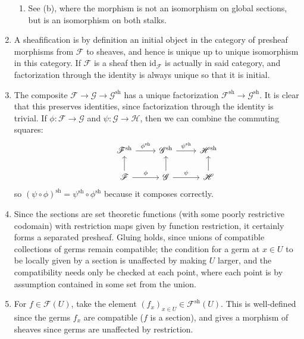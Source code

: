 \documentclass{report}
\newcommand{\sh}{{\mathrm{sh}}} %
\newcommand{\id}{{\mathrm{id}}} %
\newcommand{\scrF}{\mathscr{F}}
\newcommand{\scrG}{\mathscr{G}}
\newcommand{\scrH}{\mathscr{H}}
\begin{document}
\begin{enumerate}[label=\textbf{2.4.\Alph*.}]
\begin{enumerate}[label=(\alph*)]
		      \item See (b), where the morphism is not an isomorphism on global
		            sections, but is an isomorphism on both stalks.
	      \end{enumerate}

	\item A sheafification is by definition an initial object in the category of
	      presheaf morphisms from $\scrF$ to sheaves, and hence is unique up to
	      unique isomorphism in this category. If $\scrF$ is a sheaf then $\id_\scrF$ is
	      actually in said category, and factorization through the identity is
	      always unique so that it is initial.

	\item The composite $\scrF\to\scrG\to\scrG^\sh$ has a unique factorization
	      $\scrF^\sh\to\scrG^\sh$. It is clear that this preserves identities, since
	      factorization through the identity is trivial. If $\phi:\scrF\to\scrG$ and
	      $\psi:\scrG\to\scrH$, then we can combine the commuting squares:
	      \begin{equation*}
		      \begin{tikzcd}
			      &\scrF^\sh \arrow{r}{\phi^\sh} &\scrG^\sh \arrow{r}{\psi^\sh} &\scrH^\sh \\
			      &\scrF \arrow{r}{\phi} \arrow{u}
			      &\scrG \arrow{r}{\psi} \arrow{u}
			      &\scrH \arrow{u}
		      \end{tikzcd}
	      \end{equation*}
	      so $(\psi\circ\phi)^\sh=\psi^\sh\circ\phi^\sh$ because it composes
	      correctly.

	\item Since the sections are set theoretic functions (with some poorly
	      restrictive codomain) with restriction maps given by function
	      restriction, it certainly forms a separated presheaf. Gluing holds,
	      since unions of compatible collections of germs remain compatible; the
	      condition for a germ at $x\in U$ to be locally given by a section is
	      unaffected by making $U$ larger, and the compatibility needs only be
	      checked at each point, where each point is by assumption contained in
	      some set from the union.

	\item For $f\in\scrF(U)$, take the element $(f_x)_{x\in U}\in\scrF^\sh(U)$. This
	      is well-defined since the germs $f_x$ are compatible ($f$ is a section),
	      and gives a morphism of sheaves since germs are unaffected by
	      restriction.


\end{enumerate}
\end{document}
